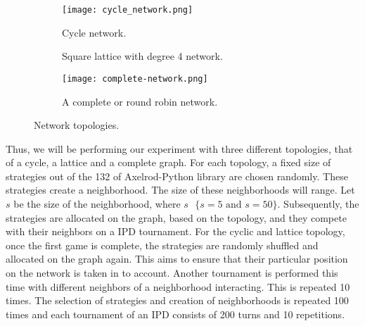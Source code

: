 \begin{figure}[!hbtp]  %
\centering
    \begin{subfigure}[t]{0.45\textwidth}
    \centering
        \texttt{[image: cycle\_network.png]}
    \caption{Cycle network.}
    \end{subfigure}
\hfill
    \begin{subfigure}[t]{0.52\textwidth}\centering
    \centering
        
    \caption{Square lattice with degree 4 network.}
    \end{subfigure}
\hfill
    \begin{subfigure}[t]{0.52\textwidth}\centering
    \centering
        \texttt{[image: complete-network.png]}
    \caption{A complete or round robin network.}
    \end{subfigure}
\caption{Network topologies.}
\label{fig:networks}
\end{figure}

Thus, we will be performing our experiment with three different topologies, that
of a cycle, a lattice and a complete graph.
For each topology, a fixed size of strategies out of the 132 of Axelrod-Python
library are chosen randomly. These strategies create a neighborhood.
The size of these neighborhoods will range. Let \( s\) be the size of
the neighborhood, where \(s \textrm{ }\{ s=5 \textrm{ and } s=50 \}\).
Subsequently, the strategies are allocated on the graph, based
on the topology, and they compete with their neighbors on a IPD tournament.
For the cyclic and lattice topology, once the first game is complete,
the strategies are randomly shuffled and allocated on the graph again. This aims
to ensure that their particular position on the network is taken in to account.
Another tournament is performed this time with different neighbors of a
neighborhood interacting.
This is repeated 10 times.
The selection of strategies and creation of neighborhoods is repeated 100 times
and each tournament of an IPD consists of 200 turns and 10 repetitions.

